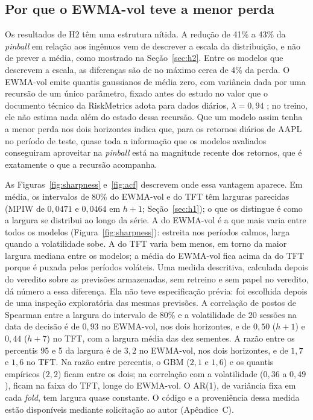 \subsection{Por que o EWMA-vol teve a menor perda} \label{sec:ewma}
Os resultados de H2 têm uma estrutura nítida. A redução de 41\% a 43\% da \textit{pinball} em relação aos ingênuos vem de descrever a escala da distribuição, e não de prever a média, como mostrado na Seção~\ref{sec:h2}. Entre os modelos que descrevem a escala, as diferenças são de no máximo cerca de 4\% da perda. O EWMA-vol emite quantis gaussianos de média zero, com variância dada por uma recursão de um único parâmetro, fixado antes do estudo no valor que o documento técnico da RiskMetrics adota para dados diários, \(\lambda = 0{,}94\) \cite{RISKMETRICS1996}; no treino, ele não estima nada além do estado dessa recursão. Que um modelo assim tenha a menor perda nos dois horizontes indica que, para os retornos diários de AAPL no período de teste, quase toda a informação que os modelos avaliados conseguiram aproveitar na \textit{pinball} está na magnitude recente dos retornos, que é exatamente o que a recursão acompanha.

As Figuras~\ref{fig:sharpness} e~\ref{fig:acf} descrevem onde essa vantagem aparece. Em média, os intervalos de 80\% do EWMA-vol e do TFT têm larguras parecidas (MPIW de \(0{,}0471\) e \(0{,}0464\) em \(h+1\); Seção~\ref{sec:h1}); o que os distingue é como a largura se distribui ao longo da série. A do EWMA-vol é a que mais varia entre todos os modelos (Figura~\ref{fig:sharpness}): estreita nos períodos calmos, larga quando a volatilidade sobe. A do TFT varia bem menos, em torno da maior largura mediana entre os modelos; a média do EWMA-vol fica acima da do TFT porque é puxada pelos períodos voláteis. Uma medida descritiva, calculada depois do veredito sobre as previsões armazenadas, sem retreino e sem papel no veredito, dá número a essa diferença. Ela não teve especificação prévia: foi escolhida depois de uma inspeção exploratória das mesmas previsões. A correlação de postos de Spearman entre a largura do intervalo de 80\% e a volatilidade de 20 sessões na data de decisão é de \(0{,}93\) no EWMA-vol, nos dois horizontes, e de \(0{,}50\) (\(h+1\)) e \(0{,}44\) (\(h+7\)) no TFT, com a largura média das dez sementes. A razão entre os percentis 95 e 5 da largura é de \(3{,}2\) no EWMA-vol, nos dois horizontes, e de \(1{,}7\) e \(1{,}6\) no TFT. Na razão entre percentis, o GBM (\(2{,}1\) e \(1{,}6\)) e os quantis empíricos (\(2{,}2\)) ficam entre os dois; na correlação com a volatilidade (\(0{,}36\) a \(0{,}49\)), ficam na faixa do TFT, longe do EWMA-vol. O AR(1), de variância fixa em cada \textit{fold}, tem largura quase constante. O código e a proveniência dessa medida estão disponíveis mediante solicitação ao autor (Apêndice~C).

